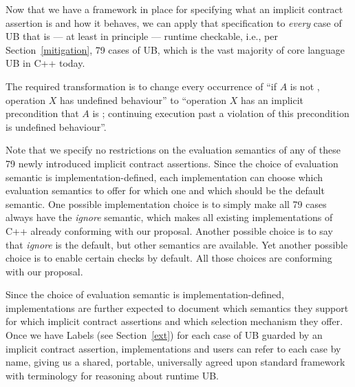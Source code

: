 {Now that we have a framework in place for specifying what an implicit contract assertion is and how it behaves, we can apply that specification to \emph{every} case of UB  that is --- at least in principle --- runtime checkable, i.e., per Section~\ref{mitigation}, 79 cases of UB, which is the vast majority of core language UB in C++ today.

The required transformation is to change every occurrence of “if $A$ is not , operation $X$ has undefined behaviour'' to ``operation $X$ has an implicit precondition that $A$ is ; continuing execution past a violation of this precondition is undefined behaviour''.

Note that we specify no restrictions on the evaluation semantics of any of these 79 newly introduced  implicit contract assertions. Since the choice of evaluation semantic is implementation-defined, each implementation can choose which evaluation semantics to offer for which one and which should be the default semantic. One possible implementation choice is to simply make all 79 cases always have the \emph{ignore} semantic, which makes all existing implementations of C++ already conforming with our proposal. Another possible choice is to say that  \emph{ignore} is the default, but other semantics are available. Yet another possible choice is to enable certain checks by default. All those choices are conforming with our proposal.

Since the choice of evaluation semantic is  implementation-defined, implementations are further expected to document which semantics they support for which implicit contract assertions and which selection mechanism they offer. Once we have Labels (see Section~\ref{ext}) for each case of UB guarded by an implicit contract assertion, implementations and users can refer to each case by name, giving us a shared, portable, universally agreed upon standard framework with terminology for reasoning about runtime UB.

}
